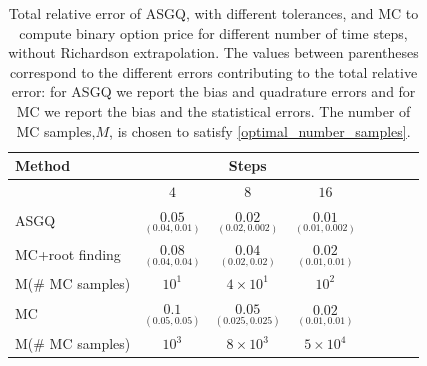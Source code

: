 \begin{table}[h!]
	\centering
	\begin{tabular}{l*{6}{c}r}
		\toprule[1.5pt]
	Method & & Steps  &     \\
	\hline
	        & $4$ & $8$ & $16$  \\
		\hline
		ASGQ   & $\underset{(0.04,0.01 )}{\mathbf{0.05}}$ & $\underset{(0.02,0.002)}{\mathbf{ 0.02}}$ & $\underset{(0.01,0.002)}{\mathbf{0.01}}$  \\
		\hline
		MC+root finding   &   $\underset{(0.04,0.04 )}{\mathbf{0.08}}$ & $\underset{(0.02,0.02)}{\mathbf{0.04}}$ & $\underset{(0.01,0.01)}{\mathbf{0.02}}$  \\	
			M(\# MC samples)   & $ 10^1$  & $4 \times 10^1$  & $  10^2$ \\	
		\hline
			MC     & $\underset{(0.05,0.05)}{\mathbf{0.1}}$ & $\underset{(0.025,0.025 )}{\mathbf{0.05}}$ & $\underset{(0.01,0.01 )}{\mathbf{0.02}}$  \\	
			M(\# MC samples)   & $ 10^3$  & $8 \times 10^3$  & $ 5 \times 10^4$ \\	
			\bottomrule[1.25pt]
	\end{tabular}
	\caption{Total relative error of ASGQ, with different tolerances, and MC to compute binary option price for different number of time steps, without Richardson extrapolation. The values between parentheses correspond to the different errors contributing to the total relative error: for ASGQ we report the bias and quadrature errors and for MC we report the bias and the statistical errors. The number of MC samples,$ M$, is chosen to satisfy \eqref{optimal_number_samples}.}
	\label{Total error of MISC and MC to compute Binary option price of the different tolerances for different number of time steps, without Richardson extrapolation. The numbers between parentheses are the corresponding absolute errors.}
\end{table}

